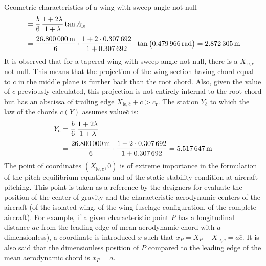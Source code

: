 \documentclass[[12pt,twoside]{book}
\begin{document}
\begin{myExampleX}{Geometric characteristics of a wing with sweep angle not null}{}
\[\begin{split}
  & {}=
    \frac{b}{6} \, \frac{1+2\lambda}{1+\lambda} \tan\Lambda_\mathrm{le} \\[3pt]
  & {}=
    \frac{\SI[round-precision=1]{\mySpanWingMT}{\metre}}{6}
      \cdot 
      \frac{
        1 + 2\cdot\SI[round-precision=2]{\myTaperRatioWing}{}
      }{
        1 + \SI[round-precision=2]{\myTaperRatioWing}{}
      }
      \cdot \tan \big( \SI[round-precision=3]{\myLambdaLERad}{\radian} \big)
    = \SI[round-precision=2]{\myXLEMACWingMT}{\metre} 
\end{split}
\]
It is observed that for a tapered wing with sweep angle not null, there is a
$X_{\mathrm{le},\bar{c}}$ not null. This means that the projection of the wing section having chord equal to $\bar{c}$ in the middle plane is further back than the root chord.
Also, given the value of $\bar{c}$ previously calculated, this projection
is not entirely internal to the root chord but has an abscissa of trailing edge $X_{\mathrm{le},\bar{c}}+\bar{c}>c_\mathrm{r}$.
The station $Y_{\bar{c}}$ to which the law of the chords $c(Y)$ assumes value$\bar{c}$ is:
\[
\begin{split}
Y_{\bar{c}} 
  & {}=
    \frac{b}{6} \, \frac{1+2\lambda}{1+\lambda} \\[3pt]
  & {}=
    \frac{\SI[round-precision=1]{\mySpanWingMT}{\metre}}{6}
      \cdot 
      \frac{
        1 + 2\cdot\SI[round-precision=2]{\myTaperRatioWing}{}
      }{
        1 + \SI[round-precision=2]{\myTaperRatioWing}{}
      }
    =  \SI[round-precision=2]{\myYMACWingMT}{\metre} 
\end{split}
\]
The point of coordinates $(X_{\mathrm{le},\bar{c}},0)$ is of extreme importance in the formulation of the pitch equilibrium equations and of the static stability condition at aircraft pitching. This point is taken as a reference by the designers for evaluate the position of the center of gravity and the characteristic aerodynamic centers of the aircraft
(of the isolated wing, of the wing-fuselage configuration, of the complete aircraft). For example, if a given characteristic point $P$ has a longitudinal distance $a\bar{c}$ from the leading edge of mean aerodynamic chord with $a$ dimensionless), a coordinate is introduced $x$ such that $x_P = X_P - X_{\mathrm{le},\bar{c}} = a\bar{c}$. It is also said that the dimensionless position of $P$ compared to the leading edge of the mean
aerodynamic chord is $\bar{x}_P=a$.
\end{myExampleX}
\end{document}
